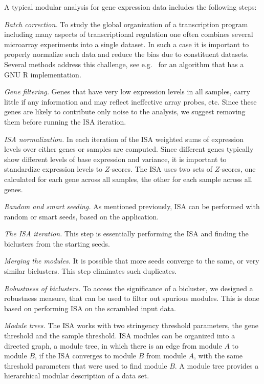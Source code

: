 \documentclass{bioinfo}
\begin{document}
A typical modular analysis for gene expression data includes the following
steps:

\emph{Batch correction.}
To study the global organization of a transcription program including
many aspects of transcriptional regulation one often combines several
microarray experiments into a single dataset. In such a case it is important
to properly normalize such data and reduce the bias due to constituent
datasets. Several methods address this challenge,
see e.g.~\cite{johnson07} for an algorithm that has a GNU R implementation.

\emph{Gene filtering.}
Genes that have very low expression levels in all samples, carry little if
any information and may reflect ineffective array probes, etc. Since these
genes are likely to contribute only noise to the analysis, we suggest
removing them before running the ISA iteration.

\emph{ISA normalization.}
In each iteration of the ISA weighted sums of expression levels over either
genes or samples are computed. Since different genes
typically show different levels of base
expression and variance, it is important to standardize expression
levels to $Z$-scores. The ISA uses two sets of $Z$-scores, one
calculated for each gene across all samples, the other for each sample
across all genes.

\emph{Random and smart seeding.}
As mentioned previously, ISA can be performed with random or smart
seeds, based on the application.

\emph{The ISA iteration.}
This step is essentially performing the ISA and finding the biclusters
from the starting seeds.

\emph{Merging the modules.}
It is possible that more seeds converge to the same, or very similar
biclusters. This step eliminates such duplicates.

\emph{Robustness of biclusters.}
To access the significance of a bicluster, we designed a robustness
measure, that can be used to filter out spurious modules. This is done
based on performing ISA on the scrambled input data.

\emph{Module trees.}
The ISA works with two stringency threshold parameters, the gene
threshold and the sample threshold. ISA modules can be organized into
a directed graph, a module tree, in which there is an edge from module
$A$ to module $B$, if the ISA converges to module $B$ from module $A$,
with the same threshold parameters  that were used to find module
$B$. A module tree provides a hierarchical modular description of a
data set.
\end{document}
